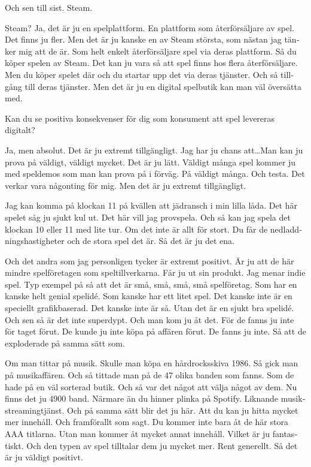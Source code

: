 \documentclass[11p]{article}
\begin{document}
\begin{otherlanguage}{swedish}
        \setlength{\leftskip}{0cm}
        Och sen till sist. Steam.


        \setlength{\leftskip}{1cm}

        Steam? Ja, det är ju en spelplattform. En plattform som återförsäljare av spel. Det finns ju fler.
        Men det är ju kanske en av Steam största, som nästan jag tänker mig att de är. Som helt enkelt återförsäljare spel via deras plattform. Så du köper spelen av Steam.
        Det kan ju vara så att spel finns hos flera återförsäljare. Men du köper spelet där och du startar upp det via deras tjänster. Och så tillgång till deras tjänster.
        Men det är ju en digital spelbutik kan man väl översätta med.


        \setlength{\leftskip}{0cm}
        Kan du se positiva konsekvenser för dig som konsument att spel levereras digitalt?


        \setlength{\leftskip}{1cm}

        Ja, men absolut. Det är ju extremt tillgängligt. Jag har ju chans att\dots Man kan ju prova på väldigt, väldigt mycket. Det är ju lätt.
        Väldigt många spel kommer ju med speldemos som man kan prova på i förväg. På väldigt många. Och testa. Det verkar vara någonting för mig. Men det är ju extremt tillgängligt.

        Jag kan komma på klockan 11 på kvällen att jädransch i min lilla låda. Det här spelet såg ju sjukt kul ut. Det här vill jag provspela. Och så kan jag spela det klockan 10 eller 11 med lite tur. Om det inte är allt för stort. Du får de nedladdningshastigheter och de stora spel det är.
        Så det är ju det ena.

        Och det andra som jag personligen tycker är extremt positivt. Är ju att de här mindre spelföretagen som speltillverkarna. Får ju ut sin produkt.
        Jag menar indie spel. Typ exempel på så att det är små, små, små, små spelföretag. Som har en kanske helt genial spelidé. Som kanske har ett litet spel.
        Det kanske inte är en speciellt grafikbaserad. Det kanske inte är så. Utan det är en sjukt bra spelidé. Och sen så är det inte superdypt. Och man kom ju åt det. För de fanns ju inte för taget förut.
        De kunde ju inte köpa på affären förut. De fanns ju inte. Så att de exploderade på samma sätt som.

        Om man tittar på musik. Skulle man köpa en hårdrocksskiva 1986.
        Så gick man på musikaffären. Och så tittade man på de 47 olika banden som fanns. Som de hade på en väl sorterad butik. Och så var det något att välja något av dem. Nu finns det ju 4900 band.
        Närmare än du hinner plinka på Spotify. Liknande musikstreamingtjänst. Och på samma sätt blir det ju här. Att du kan ju hitta mycket mer innehåll. Och framförallt som sagt. Du kommer inte bara åt de här stora AAA titlarna.
        Utan man kommer åt mycket annat innehåll. Vilket är ju fantastiskt. Och den typen av spel tilltalar dem ju mycket mer. Rent generellt. Så det är ju väldigt positivt.



\end{otherlanguage}
\end{document}
